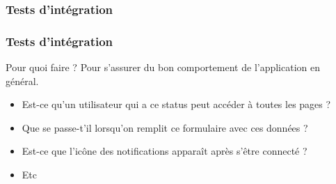 \documentclass{beamer}
\begin{document}
      \subsubsection{Tests d'intégration}
      \begin{frame}
        \frametitle{Tests d'intégration}
        \begin{block}{Pour quoi faire ?}
          Pour s'assurer du bon comportement de l'application en général.
          \begin{itemize}
            \item Est-ce qu'un utilisateur qui a ce status peut accéder à toutes les pages ?
            \item Que se passe-t'il lorsqu'on remplit ce formulaire avec ces données ?
            \item Est-ce que l'icône des notifications apparaît après s'être connecté ?
            \item Etc
          \end{itemize}           
        \end{block}      
      \end{frame}
\end{document}
